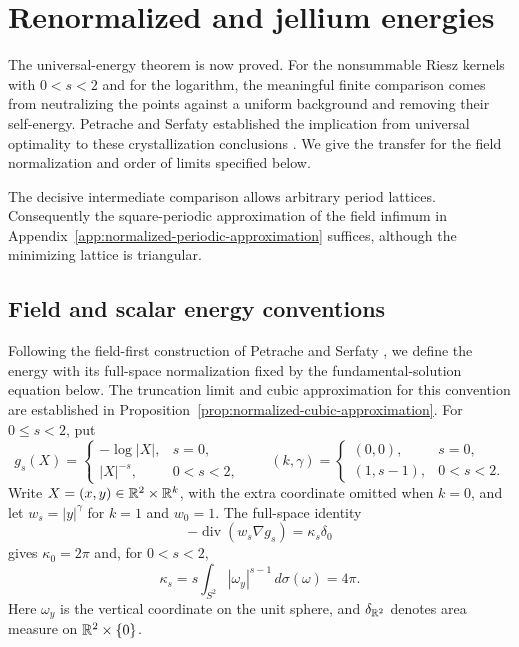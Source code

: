 \section{Renormalized and jellium energies}
\label{sec:renormalized}

The universal-energy theorem is now proved. For the nonsummable Riesz
kernels with $0<s<2$ and for the logarithm, the meaningful finite comparison
comes from neutralizing the points against a uniform background and removing
their self-energy. Petrache and Serfaty established the implication from
universal optimality to these crystallization conclusions
\citep[Theorem~2]{PetracheSerfaty2020}. We give the transfer for the field
normalization and order of limits specified below.

The decisive intermediate comparison allows arbitrary period lattices.
Consequently the square-periodic approximation of the field infimum in
Appendix~\ref{app:normalized-periodic-approximation} suffices, although the
minimizing lattice is triangular.

\subsection{Field and scalar energy conventions}

Following the field-first construction of Petrache and Serfaty
\citep[Definitions~1.2--1.3]{PetracheSerfaty2017}, we define the energy
with its full-space normalization fixed by the fundamental-solution
equation below.  The truncation limit and cubic approximation for this
convention are established in
Proposition~\ref{prop:normalized-cubic-approximation}.
For $0\le s<2$, put
\[
 g_s(X)=\begin{cases}-\log|X|,&s=0,\\ |X|^{-s},&0<s<2,\end{cases}
 \qquad
 (k,\gamma)=\begin{cases}(0,0),&s=0,\\(1,s-1),&0<s<2.\end{cases}
\]
Write $X=(x,y)\in\mathbb R^2\times\mathbb R^k$, with the extra coordinate omitted
when $k=0$, and let $w_s=|y|^\gamma$ for $k=1$ and $w_0=1$.
The full-space identity
\[
 -\operatorname{div}(w_s\nabla g_s)=\kappa_s\delta_0
\]
gives $\kappa_0=2\pi$ and, for $0<s<2$,
\[
 \kappa_s=s\int_{S^2}|\omega_y|^{s-1}\,d\sigma(\omega)=4\pi.
\]
Here $\omega_y$ is the vertical coordinate on the unit sphere, and
$\delta_{\mathbb R^2}$ denotes area measure on $\mathbb R^2\times\{0\}$.

